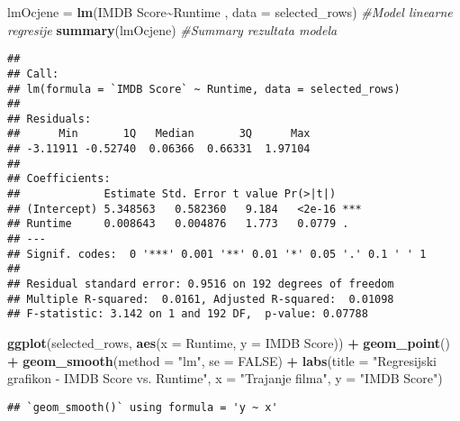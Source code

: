 \documentclass[
]{article}
\newenvironment{Shaded}{\begin{snugshade}}{\end{snugshade}}
\newcommand{\AttributeTok}[1]{\textcolor[rgb]{0.13,0.29,0.53}{#1}}
\newcommand{\CommentTok}[1]{\textcolor[rgb]{0.56,0.35,0.01}{\textit{#1}}}
\newcommand{\ConstantTok}[1]{\textcolor[rgb]{0.56,0.35,0.01}{#1}}
\newcommand{\FunctionTok}[1]{\textcolor[rgb]{0.13,0.29,0.53}{\textbf{#1}}}
\newcommand{\NormalTok}[1]{#1}
\newcommand{\OtherTok}[1]{\textcolor[rgb]{0.56,0.35,0.01}{#1}}
\newcommand{\SpecialCharTok}[1]{\textcolor[rgb]{0.81,0.36,0.00}{\textbf{#1}}}
\newcommand{\StringTok}[1]{\textcolor[rgb]{0.31,0.60,0.02}{#1}}
\begin{document}
\begin{Shaded}
\begin{Highlighting}[]
\NormalTok{lmOcjene }\OtherTok{=} \FunctionTok{lm}\NormalTok{(}\StringTok{\textasciigrave{}}\AttributeTok{IMDB Score}\StringTok{\textasciigrave{}}\SpecialCharTok{\textasciitilde{}}\NormalTok{Runtime , }\AttributeTok{data =}\NormalTok{ selected\_rows) }\CommentTok{\#Model linearne regresije}
\FunctionTok{summary}\NormalTok{(lmOcjene) }\CommentTok{\#Summary rezultata modela}
\end{Highlighting}
\end{Shaded}

\begin{verbatim}
## 
## Call:
## lm(formula = `IMDB Score` ~ Runtime, data = selected_rows)
## 
## Residuals:
##      Min       1Q   Median       3Q      Max 
## -3.11911 -0.52740  0.06366  0.66331  1.97104 
## 
## Coefficients:
##             Estimate Std. Error t value Pr(>|t|)    
## (Intercept) 5.348563   0.582360   9.184   <2e-16 ***
## Runtime     0.008643   0.004876   1.773   0.0779 .  
## ---
## Signif. codes:  0 '***' 0.001 '**' 0.01 '*' 0.05 '.' 0.1 ' ' 1
## 
## Residual standard error: 0.9516 on 192 degrees of freedom
## Multiple R-squared:  0.0161, Adjusted R-squared:  0.01098 
## F-statistic: 3.142 on 1 and 192 DF,  p-value: 0.07788
\end{verbatim}

\begin{Shaded}
\begin{Highlighting}[]
\FunctionTok{ggplot}\NormalTok{(selected\_rows, }\FunctionTok{aes}\NormalTok{(}\AttributeTok{x =}\NormalTok{ Runtime, }\AttributeTok{y =} \StringTok{\textasciigrave{}}\AttributeTok{IMDB Score}\StringTok{\textasciigrave{}}\NormalTok{)) }\SpecialCharTok{+}
  \FunctionTok{geom\_point}\NormalTok{() }\SpecialCharTok{+}
  \FunctionTok{geom\_smooth}\NormalTok{(}\AttributeTok{method =} \StringTok{"lm"}\NormalTok{, }\AttributeTok{se =} \ConstantTok{FALSE}\NormalTok{) }\SpecialCharTok{+}
  \FunctionTok{labs}\NormalTok{(}\AttributeTok{title =} \StringTok{"Regresijski grafikon {-} IMDB Score vs. Runtime"}\NormalTok{, }
       \AttributeTok{x =} \StringTok{"Trajanje filma"}\NormalTok{, }\AttributeTok{y =} \StringTok{"IMDB Score"}\NormalTok{)}
\end{Highlighting}
\end{Shaded}

\begin{verbatim}
## `geom_smooth()` using formula = 'y ~ x'
\end{verbatim}
\end{document}
